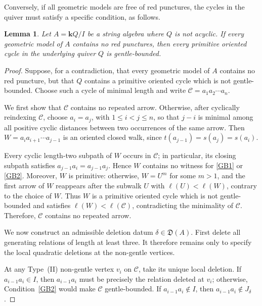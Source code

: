\documentclass[11pt]{amsart}
\numberwithin{equation}{section}
\newtheorem{lemma}[theorem]{Lemma}
\theoremstyle{definition}
\begin{document}
 Conversely, if all geometric models are free of red punctures, the cycles in the quiver must satisfy a specific condition, as follows.
 
\begin{lemma}\label{lem:no-puncture}
Let $A = \mathbf{k}Q/I$ be a string algebra where $Q$ is not acyclic. If every geometric model of $A$ contains no red punctures, then every primitive oriented cycle in the underlying quiver $Q$ is gentle-bounded.
\end{lemma}
\begin{proof}
Suppose, for a contradiction, that every geometric model of \(A\)
contains no red puncture, but that \(Q\) contains a primitive
oriented cycle which is not gentle-bounded. Choose such a cycle of
minimal length and write
$\mathcal{C}=a_1a_2\cdots a_n$.


We first show that \(\mathcal{C}\) contains no repeated arrow.
Otherwise, after cyclically reindexing \(\mathcal{C}\), choose
\(a_i=a_j\), with \(1\leq i<j\leq n\), so that \(j-i\) is minimal
among all positive cyclic distances between two occurrences of the
same arrow. Then
$W=a_i a_{i+1}\cdots a_{j-1}$
is an oriented closed walk, since $t(a_{j-1})=s(a_j)=s(a_i)$. 

Every cyclic length-two subpath of \(W\) occurs in
\(\mathcal{C}\); in particular, its closing subpath satisfies $a_{j-1}a_i=a_{j-1}a_j$.
Hence \(W\) contains no witness for \ref{GB1} or
\ref{GB2}. Moreover, \(W\) is primitive: otherwise,
\(W=U^m\) for some \(m>1\), and the first arrow of \(W\) reappears after the subwalk $U$ with $\ell(U)<\ell(W)$, contrary to the choice of \(W\). Thus \(W\) is a primitive oriented cycle which is not gentle-bounded and satisfies \(\ell(W)<\ell(\mathcal{C})\), contradicting the minimality of \(\mathcal{C}\). Therefore, \(\mathcal{C}\) contains no repeated arrow.









We now construct an admissible deletion datum
$\delta\in\mathfrak{D}(A)$.
First delete all generating relations of length at least three. It therefore remains only to specify the local quadratic deletions at
the non-gentle vertices.

At any Type~\textup{(II)} non-gentle vertex \(v_i\) on
\(\mathcal{C}\), take its unique local deletion. If
\(a_{i-1}a_i\in I\), then \(a_{i-1}a_i\) must be precisely the
relation deleted at \(v_i\); otherwise, Condition~\ref{GB2} would
make \(\mathcal{C}\) gentle-bounded. If
\(a_{i-1}a_i\notin I\), then
\(a_{i-1}a_i\notin J_\delta\) .


\end{proof}
\end{document}

